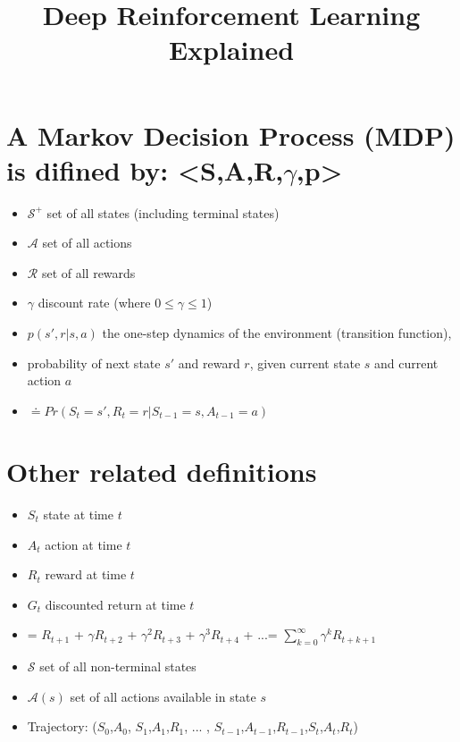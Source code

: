 \documentclass[10pt]{amsart}
\title{Deep Reinforcement Learning Explained}
\begin{document}
\maketitle
\thispagestyle{fancy}



\section*{A Markov Decision Process (MDP) is difined by: <S,A,R,$\gamma$,p>}

\begin{itemize}

\item[] $\mathcal{S}^+$ \tabto{2cm} set of all states (including terminal states)
\item[] $\mathcal{A}$ \tabto{2cm} set of all actions 

\item[] $\mathcal{R}$ \tabto{2cm} set of all rewards

\item[] $\gamma$ \tabto{2cm} discount rate (where $0 \leq \gamma \leq 1$)
\item[] $p(s',r|s,a)$ \tabto{2cm} the one-step dynamics of the environment (transition function),
\item[] \tabto{2cm} probability of next state $s'$ and reward $r$, given current state $s$ and current action $a$
\item[]  \tabto{2cm}  $\doteq Pr(S_{t}=s', R_{t}=r|S_{t-1} = s, A_{t-1} = a)$
\end{itemize}

\vspace{.5in}

\section*{Other related definitions}
\begin{itemize}
\item[] $S_t$ \tabto{2cm} state at time $t$
\item[] $A_t$ \tabto{2cm} action at time $t$
\item[] $R_t$ \tabto{2cm} reward at time $t$

\item[] $G_t$ \tabto{2cm} discounted return at time $t$ 
\item[] \tabto{2cm}  =  $R_{t+1}$ + $\gamma R_{t+2}$ + $\gamma^2 R_{t+3}$ + $\gamma^3 R_{t+4}$ + ...= $\sum_{k=0}^\infty \gamma^k R_{t+k+1}$
\item[] $\mathcal{S}$ \tabto{2cm} set of all non-terminal states
\item[] $\mathcal{A}(s)$ \tabto{2cm} set of all actions available in state $s$
\item[] Trajectory: \tabto{2cm} ($S_0$,$A_0$, $S_1$,$A_1$,$R_1$, ... , $S_{t-1}$,$A_{t-1}$,$R_{t-1}$,$S_t$,$A_t$,$R_t$)
\end{itemize}
\end{document}
